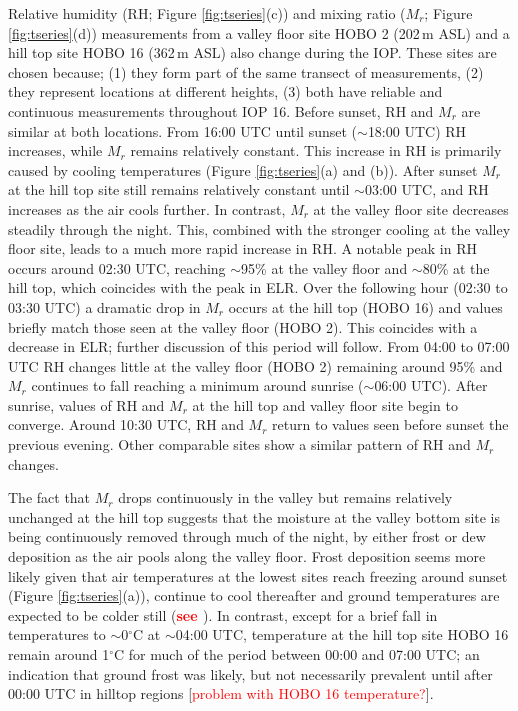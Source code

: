 \documentclass[times]{qjrms4}
\begin{document}
Relative humidity (RH; Figure \ref{fig:tseries}(c)) and mixing ratio ($M_r$; Figure \ref{fig:tseries}(d)) measurements from a valley floor site HOBO 2 (202$\,\mbox{m}$ ASL) and a hill top site HOBO 16 (362$\,\mbox{m}$ ASL) also change during the IOP. These sites are chosen because; (1) they form part of the same transect of measurements, (2) they represent locations at different heights, (3) both have reliable and continuous measurements throughout IOP 16. Before sunset, RH and $M_r$ are similar at both locations. From 16:00 UTC until sunset ($\sim$18:00 UTC) RH increases, while $M_r$ remains relatively constant. This increase in RH is primarily caused by cooling temperatures (Figure \ref{fig:tseries}(a) and (b)). After sunset $M_r$ at the hill top site still remains relatively constant until $\sim$03:00 UTC, and RH increases as the air cools further. In contrast, $M_r$ at the valley floor site decreases steadily through the night. This, combined with the stronger cooling at the valley floor site, leads to a much more rapid increase in RH. A notable peak in RH occurs around 02:30 UTC, reaching $\sim$95\% at the valley floor and $\sim$80\% at the hill top, which coincides with the peak in ELR. Over the following hour (02:30 to 03:30 UTC) a dramatic drop in $M_r$ occurs at the hill top (HOBO 16) and values briefly match those seen at the valley floor (HOBO 2). This coincides with a decrease in ELR; further discussion of this period will follow. From 04:00 to 07:00 UTC RH changes little at the valley floor (HOBO 2) remaining around 95\% and $M_r$ continues to fall reaching a minimum around sunrise ($\sim$06:00 UTC). After sunrise, values of RH and $M_r$ at the hill top and valley floor site begin to converge. Around 10:30 UTC, RH and $M_r$ return to values seen before sunset the previous evening. Other comparable sites show a similar pattern of RH and $M_r$ changes.

The fact that $M_r$ drops continuously in the valley but remains relatively unchanged at the hill top suggests that the moisture at the valley bottom site is being continuously removed through much of the night, by either frost or dew deposition as the air pools along the valley floor. Frost deposition seems more likely given that air temperatures at the lowest sites reach freezing around sunset (Figure \ref{fig:tseries}(a)), continue to cool thereafter and ground temperatures are expected to be colder still (\textcolor{red}{\bf see \citet{Vosper2013narrow}}). In contrast, except for a brief fall in temperatures to $\sim$0$^{\circ}$C at $\sim$04:00 UTC, temperature at the hill top site HOBO 16 remain around 1$^\circ$C for much of the period between 00:00 and 07:00 UTC; an indication that ground frost was likely, but not necessarily prevalent until after 00:00 UTC in hilltop regions [\textcolor{red}{problem with HOBO 16 temperature?}].
\end{document}
